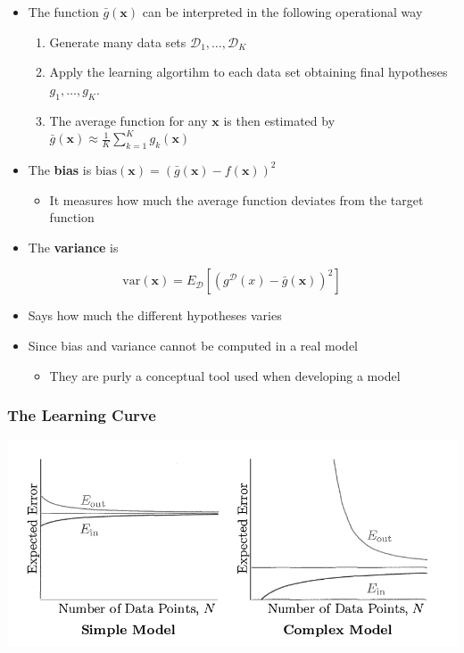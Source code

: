 \documentclass[11pt]{article}
\begin{document}
\begin{itemize}
\item The function \(\bar g (\pmb x)\) can be interpreted in the following operational way
\begin{enumerate}
\item Generate many data sets \(\mathcal D_1, \dots, \mathcal D_K\)
\item Apply the learning algortihm to each data set obtaining final hypotheses \(g_1,\dots,g_K\).
\item The average function for any \(\pmb x\) is then estimated by \(\bar g(\pmb x) \approx \frac1K \sum_{k=1}^K g_k(\pmb x)\)
\end{enumerate}

\item The \textbf{bias} is \(\text{bias}(\pmb x) = (\bar g(\pmb x) - f(\pmb x))^2\)
\begin{itemize}
\item It measures how much the average function deviates from the target function
\end{itemize}

\item The \textbf{variance} is
\end{itemize}
\begin{equation}
	\text{var}(\pmb x)   = E_\mathcal D [(g^{\mathcal D}(x) - \bar g(\pmb x))^2]
\end{equation}
\begin{itemize}
\item Says how much the different hypotheses varies

\item Since bias and variance cannot be computed in a real model
\begin{itemize}
\item They are purly a conceptual tool used when developing a model
\end{itemize}
\end{itemize}

\subsubsection{The Learning Curve}
\label{sec:org341662d}
\begin{center}
\includegraphics[width=.9\linewidth]{Training versus Testing (2)/screenshot_2018-09-12_20-08-30.png}
\end{center}
\end{document}
